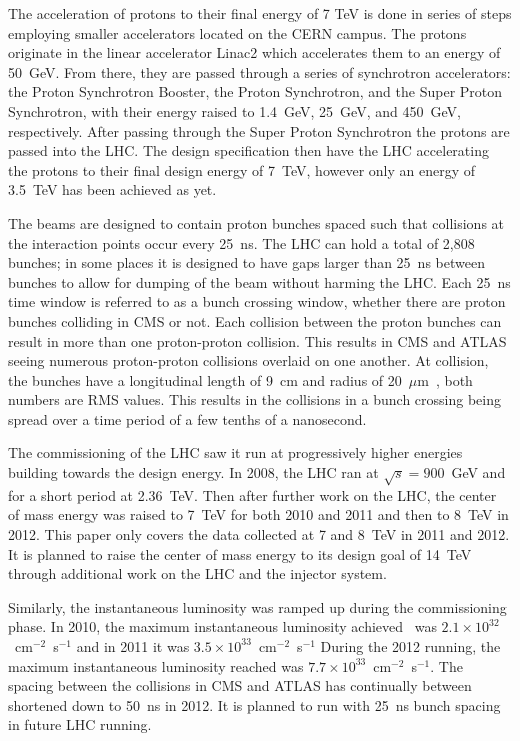The acceleration of protons to their final energy of 7 TeV is done in series of steps employing smaller accelerators located on the CERN campus. 
The protons originate in the linear accelerator Linac2 which accelerates them to an energy of 50~GeV.
From there, they are passed through a series of synchrotron accelerators: the Proton Synchrotron Booster, the Proton Synchrotron,
and the Super Proton Synchrotron, with their energy raised to 1.4~GeV, 25~GeV, and 450~GeV, respectively. After passing through the Super Proton Synchrotron the protons
are passed into the LHC. The design specification then have the LHC accelerating the protons to their final design energy of 7~TeV, however only an energy of 3.5~TeV
has been achieved as yet.

The beams are designed to contain proton bunches spaced such that collisions at the interaction points occur every 25~ns. 
The LHC can hold a total of 2,808 bunches; in some places it is designed to have gaps larger than 25~ns between
bunches to allow for dumping of the beam without harming the LHC.
Each 25~ns time window is referred to as a bunch crossing window, whether there are proton bunches colliding in CMS or not.
Each collision between the proton bunches can
result in more than one proton-proton collision. This results in CMS and ATLAS seeing numerous proton-proton collisions overlaid on one another.
At collision, the bunches have a longitudinal length of 9~cm and radius of 20~$\mu$m~\cite{PDG}, both numbers are RMS values.
This results in the collisions in a bunch crossing being spread over a time period of a few tenths of a nanosecond.

The commissioning of the LHC saw it run at progressively higher energies building towards the design energy. In 2008, the LHC ran at
$\sqrt{s}=900$~GeV and for a short period at 2.36~TeV. Then after further work on the LHC, the center of mass energy was raised 
to 7~TeV for both 2010 and 2011 and then to 8~TeV in 2012.
This paper only covers the data collected at 7 and 8~TeV in 2011 and 2012. It is planned to raise the center of mass energy to its 
design goal of 14~TeV through additional work on the LHC and the injector system.

Similarly, the instantaneous luminosity was ramped up during the commissioning phase. In 2010, the maximum instantaneous luminosity achieved~\cite{PublicLumi}
was $2.1\times10^{32}$~cm$^{-2}$~s$^{-1}$ and in 2011 it was $3.5\times10^{33}$~cm$^{-2}$~s$^{-1}$
During the 2012 running, the maximum instantaneous luminosity reached was $7.7\times10^{33}$~cm$^{-2}$~s$^{-1}$.
The spacing between the collisions in CMS and ATLAS has continually between shortened down to 50~ns in 2012.
It is planned to run with 25~ns bunch spacing in future LHC running.

